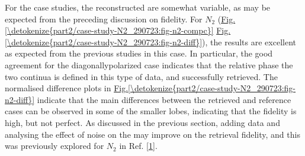 \documentclass[letterpaper,table,10pt,english]{jupyterBook}
\begin{document}
\sphinxAtStartPar
For the case studies, the reconstructed {\hyperref[\detokenize{backmatter/glossary:term-MF}]{}} are somewhat variable, as may be expected from the preceding discussion on fidelity. For \(N_2\) (\hyperref[\detokenize{part2/case-study-N2_290723:fig-n2-compc}]{Fig.\@ \ref{\detokenize{part2/case-study-N2_290723:fig-n2-compc}}} \sphinxhyphen{} \hyperref[\detokenize{part2/case-study-N2_290723:fig-n2-diff}]{Fig.\@ \ref{\detokenize{part2/case-study-N2_290723:fig-n2-diff}}}), the results are excellent \sphinxhyphen{} as expected from the previous studies in this case. In particular, the good agreement for the diagonally\sphinxhyphen{}polarized case indicates that the relative phase  the two continua is defined in this type of data, and successfully retrieved. The normalised difference plots in \hyperref[\detokenize{part2/case-study-N2_290723:fig-n2-diff}]{Fig.\@ \ref{\detokenize{part2/case-study-N2_290723:fig-n2-diff}}} indicate that the main differences between the retrieved and reference cases can be observed in some of the smaller lobes, indicating that the fidelity is high, but not perfect. As discussed in the previous section, adding data and analysing the effect of noise on the {\hyperref[\detokenize{backmatter/glossary:term-bootstrap-retrieval-protocol}]{}} may improve on the retrieval fidelity, and this was previously explored for \(N_2\) in Ref. {[}\hyperlink{cite.backmatter/bibliography:id776}{1}{]}.
\end{document}
